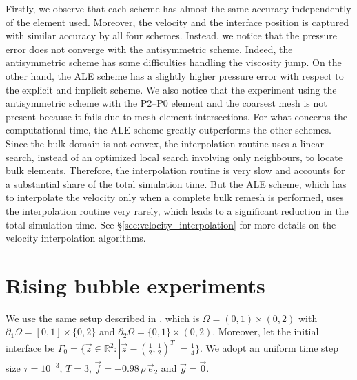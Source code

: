\documentclass[a4paper,12pt,onecolumn]{article}
\newcommand{\R}{\mathbb R}
\begin{document}
Firstly, we observe that each scheme has almost the same accuracy independently
of the element used. Moreover, the velocity and the interface position is
captured with similar accuracy by all four schemes. Instead, we notice that the
pressure error does not converge with the antisymmetric scheme. Indeed, the
antisymmetric scheme has some difficulties handling the viscosity jump. On the
other hand, the ALE scheme has a slightly higher pressure error with respect
to the explicit and implicit scheme. We also notice that the experiment using
the antisymmetric scheme with the P2--P0 element and the coarsest mesh is not
present because it fails due to mesh element intersections. For what concerns
the computational time, the ALE scheme greatly outperforms the other schemes.
Since the bulk domain is not convex, the interpolation routine uses a linear
search, instead of an optimized local search involving only neighbours, to
locate bulk elements. Therefore, the interpolation routine is very slow and
accounts for a substantial share of the total simulation time. But the ALE
scheme, which has to interpolate the velocity only when a complete bulk remesh
is performed, uses the interpolation routine very rarely, which leads to a
significant reduction in the total simulation time. See
\S\ref{sec:velocity_interpolation} for more details on the velocity
interpolation algorithms.

\section{Rising bubble experiments}\label{sec:2d_rising_bubble_results}
We use the same  setup described in \cite[Figure~2]{HysingTKPBGT09}, which is
$\Omega = (0,1) \times (0,2)$ with $\partial_1\Omega = [0,1] \times \{0,2\}$
and $\partial_2\Omega = \{0,1\} \times (0,2)$. Moreover, let the initial
interface be $\Gamma_0 = \{\vec z \in \R^2 : |\vec z - (\frac{1}{2},
\frac{1}{2})^T| = \frac{1}{4}\}$.  We adopt an uniform time step size
$\tau=10^{-3}$, $T=3$, $\vec f = -0.98\,\rho\,\vec e_2$ and $\vec g=\vec 0$.
\end{document}
